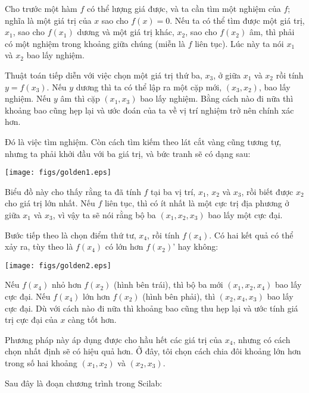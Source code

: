 \documentclass[12pt]{book}
\begin{document}
Cho trước một hàm $f$ có thể lượng giá được, và ta cần tìm một
nghiệm của $f$; nghĩa là một giá trị của $x$ sao cho $f(x)=0$.  
Nếu ta có thể tìm được một giá trị, $x_1$, sao cho $f(x_1)$ 
dương và một giá trị khác, $x_2$, sao cho $f(x_2)$ âm, thì
phải có một nghiệm trong khoảng giữa chúng (miễn là $f$ liên tục).
Lúc này ta nói $x_1$ và $x_2$ bao lấy nghiệm.

Thuật toán tiếp diễn với việc chọn một giá trị thứ ba, $x_3$, 
ở giữa $x_1$ và $x_2$ rồi tính $y = f(x_3)$.  Nếu $y$ dương thì ta
có thể lập ra một cặp mới, $(x_3, x_2)$, bao lấy nghiệm. Nếu 
$y$ âm thì cặp $(x_1, x_3)$ bao lấy nghiệm. Bằng cách nào đi nữa
thì khoảng bao cũng hẹp lại và ước đoán của ta về vị trí nghiệm
trở nên chính xác hơn.

Đó là việc tìm nghiệm. Còn cách tìm kiếm theo lát cắt vàng cũng
tương tự, nhưng ta phải khởi đầu với ba giá trị, và bức tranh
sẽ có dạng sau:

\centerline{\texttt{[image: figs/golden1.eps]}}

Biểu đồ này cho thấy rằng ta đã tính $f$ tại ba vị trí,
$x_1$, $x_2$ và $x_3$, rồi biết được $x_2$ cho giá trị lớn nhất.
Nếu $f$ liên tục, thì có ít nhất là một cực trị địa phương ở
giữa $x_1$ và $x_3$, vì vậy ta sẽ nói rằng bộ ba $(x_1, x_2, x_3)$
bao lấy một cực đại.

Bước tiếp theo là chọn điểm thứ tư, $x_4$, rồi tính $f(x_4)$. 
Có hai kết quả có thể xảy ra, tùy theo là $f(x_4)$ có lớn hơn $f(x_2)$'
hay không:

\centerline{\texttt{[image: figs/golden2.eps]}}

Nếu $f(x_4)$ nhỏ hơn  $f(x_2)$ (hình bên trái), thì bộ ba mới
$(x_1, x_2, x_4)$ bao lấy cực đại. Nếu $f(x_4)$ lớn hơn
$f(x_2)$ (hình bên phải), thì $(x_2, x_4, x_3)$ bao lấy cực đại.
Dù với cách nào đi nữa thì khoảng bao cũng thu hẹp lại và 
ước tính giá trị cực đại của $x$ càng tốt hơn.

Phương pháp này áp dụng được cho hầu hết các giá trị của $x_4$,
nhưng có cách chọn nhất định sẽ có hiệu quả hơn. Ở đây, tôi chọn 
cách chia đôi khoảng lớn hơn trong số hai khoảng $(x_1, x_2)$ và 
$(x_2, x_3)$.

Sau đây là đoạn chương trình trong Scilab:
\end{document}

